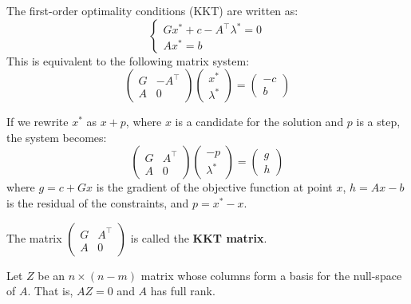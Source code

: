 The first-order optimality conditions (KKT) are written as:
\begin{equation}
    \begin{cases}
        G x^* + c - A^\top \lambda^* = 0 \\
        A x^* = b
    \end{cases}
\end{equation}
This is equivalent to the following matrix system:
\begin{equation}
    \begin{pmatrix}
        G & -A^\top \\
        A & 0
    \end{pmatrix}
    \begin{pmatrix}
        x^* \\
        \lambda^*
    \end{pmatrix}
    =
    \begin{pmatrix}
        -c \\
        b
    \end{pmatrix}
\end{equation}

\begin{remarque}
    If we rewrite $x^*$ as $x + p$, where $x$ is a candidate for the solution and $p$ is a step, the system becomes:
    \begin{equation}
        \begin{pmatrix}
            G & A^\top \\
            A & 0
        \end{pmatrix}
        \begin{pmatrix}
            -p \\
            \lambda^*
        \end{pmatrix}
        =
        \begin{pmatrix}
            g \\
            h
        \end{pmatrix}
    \end{equation}
    where $g = c + Gx$ is the gradient of the objective function at point $x$, $h = Ax - b$ is the residual of the constraints, and $p = x^* - x$.
    
    The matrix $\begin{pmatrix} G & A^\top \\ A & 0 \end{pmatrix}$ is called the \textbf{KKT matrix}.
\end{remarque}

Let $Z$ be an $n \times (n-m)$ matrix whose columns form a basis for the null-space of $A$. That is, $AZ = 0$ and $A$ has full rank.

